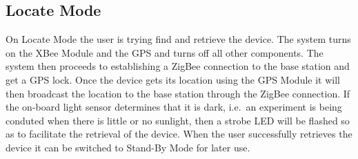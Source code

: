 \subsection{Locate Mode}
On Locate Mode the user is trying find and retrieve the device. The system turns on the XBee Module and the GPS and turns off all other components. The system then proceeds to establishing a ZigBee connection to the base station and get a GPS lock. Once the device gets its location using the GPS Module it will then broadcast the location to the base station through the ZigBee connection. If the on-board light sensor determines that it is dark, i.e.\ an experiment is being conduted when there is little or no sunlight, then a strobe LED will be flashed so as to facilitate the retrieval of the device. When the user successfully retrieves the device it can be switched to Stand-By Mode for later use.
